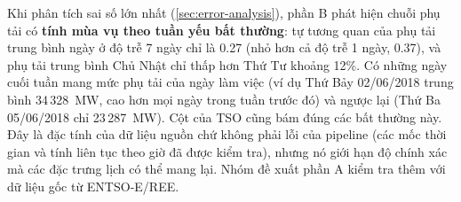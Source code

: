 Khi phân tích sai số lớn nhất (\cref{sec:error-analysis}), phần B phát hiện chuỗi phụ tải có \textbf{tính mùa vụ
theo tuần yếu bất thường}: tự tương quan của phụ tải trung bình ngày ở độ trễ 7 ngày chỉ là 0.27 (nhỏ hơn
cả độ trễ 1 ngày, 0.37), và phụ tải trung bình Chủ Nhật chỉ thấp hơn Thứ Tư khoảng 12\%. Có những ngày cuối tuần
mang mức phụ tải của ngày làm việc (ví dụ Thứ Bảy 02/06/2018 trung bình 34\,328~MW, cao hơn mọi ngày trong
tuần trước đó) và ngược lại (Thứ Ba 05/06/2018 chỉ 23\,287~MW). Cột  của TSO cũng
bám đúng các bất thường này. Đây là đặc tính của dữ liệu nguồn chứ không phải lỗi của pipeline (các mốc thời
gian và tính liên tục theo giờ đã được kiểm tra), nhưng nó giới hạn độ chính xác mà các đặc trưng lịch có thể
mang lại. Nhóm đề xuất phần A kiểm tra thêm với dữ liệu gốc từ ENTSO-E/REE.
